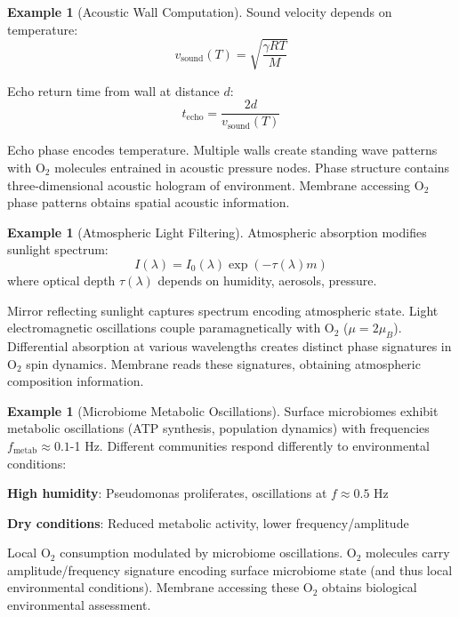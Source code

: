 \documentclass[11pt,a4paper]{article}
\theoremstyle{definition}
\newtheorem{example}[theorem]{Example}
\theoremstyle{remark}
\begin{document}
\begin{example}[Acoustic Wall Computation]
Sound velocity depends on temperature:
\begin{equation}
v_{\text{sound}}(T) = \sqrt{\frac{\gamma RT}{M}}
\end{equation}

Echo return time from wall at distance $d$:
\begin{equation}
t_{\text{echo}} = \frac{2d}{v_{\text{sound}}(T)}
\end{equation}

Echo phase encodes temperature. Multiple walls create standing wave patterns with O$_2$ molecules entrained in acoustic pressure nodes. Phase structure contains three-dimensional acoustic hologram of environment. Membrane accessing O$_2$ phase patterns obtains spatial acoustic information.
\end{example}

\begin{example}[Atmospheric Light Filtering]
Atmospheric absorption modifies sunlight spectrum:
\begin{equation}
I(\lambda) = I_0(\lambda) \exp(-\tau(\lambda) m)
\end{equation}
where optical depth $\tau(\lambda)$ depends on humidity, aerosols, pressure. 

Mirror reflecting sunlight captures spectrum encoding atmospheric state. Light electromagnetic oscillations couple paramagnetically with O$_2$ ($\mu = 2\mu_B$). Differential absorption at various wavelengths creates distinct phase signatures in O$_2$ spin dynamics. Membrane reads these signatures, obtaining atmospheric composition information.
\end{example}

\begin{example}[Microbiome Metabolic Oscillations]
Surface microbiomes exhibit metabolic oscillations (ATP synthesis, population dynamics) with frequencies $f_{\text{metab}} \approx 0.1$-1 Hz. Different communities respond differently to environmental conditions:

\textbf{High humidity}: Pseudomonas proliferates, oscillations at $f \approx 0.5$ Hz

\textbf{Dry conditions}: Reduced metabolic activity, lower frequency/amplitude

Local O$_2$ consumption modulated by microbiome oscillations. O$_2$ molecules carry amplitude/frequency signature encoding surface microbiome state (and thus local environmental conditions). Membrane accessing these O$_2$ obtains biological environmental assessment.
\end{example}
\end{document}
